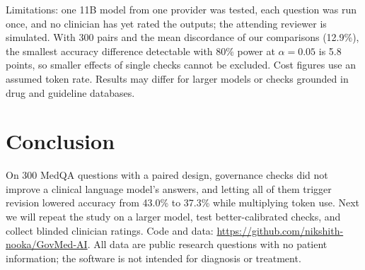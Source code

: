 \documentclass[conference]{IEEEtran}
\begin{document}
Limitations: one 11B model from one provider was tested, each question was run once, and no clinician has yet rated
the outputs; the attending reviewer is simulated. With 300 pairs and the mean discordance of our comparisons
(12.9\%), the smallest accuracy difference detectable with 80\% power at \mbox{$\alpha = 0.05$} is 5.8 points, so smaller
effects of single checks cannot be excluded. Cost figures use an assumed token rate. Results may differ for larger
models or checks grounded in drug and guideline databases.

\section{Conclusion}
On 300 MedQA questions with a paired design, governance checks did not improve a clinical language model's answers,
and letting all of them trigger revision lowered accuracy from 43.0\% to 37.3\% while multiplying token use. Next we
will repeat the study on a larger model, test better-calibrated checks, and collect blinded clinician ratings.
Code and data: \url{https://github.com/nikshith-nooka/GovMed-AI}. All data are public research questions with no patient
information; the software is not intended for diagnosis or treatment.
\end{document}
